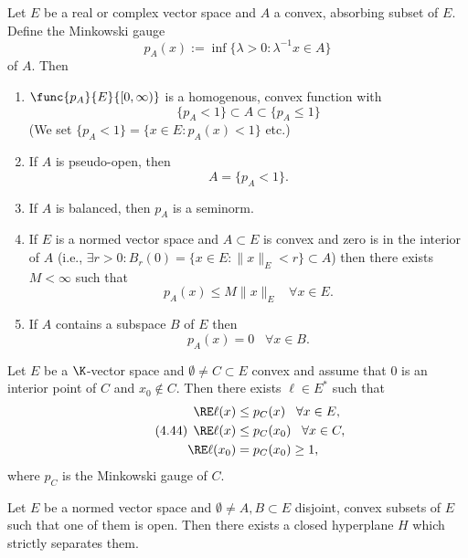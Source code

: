 \begin{prop}\label{iv.19}
    Let $E$ be a real or complex vector space and $A$ a convex, absorbing subset of $E$. Define the Minkowski gauge
    \[p_A(x):=\inf\{\lambda>0\colon\lambda^{-1}x\in A\}\]
    of $A$. Then
    \begin{enumerate}[label=\alph*)]
        \item $\func{p_A}{E}{[0,\infty)}$ is a homogenous, convex function with\label{iv.19.a}
        \[\{p_A<1\}\subset A\subset \{p_A\leq1\}\tag{4.40}\label{4.40}\]
        \big(We set $\{p_A<1\}=\{x\in E\colon p_A(x)<1\}$ etc.\big)
        \item If $A$ is pseudo-open, then\label{iv.19.b}
        \[A=\{p_A<1\}.\tag{4.41}\label{4.41}\]
        \item If $A$ is balanced, then $p_A$ is a seminorm.\label{iv.19.c}
        \item If $E$ is a normed vector space and $A\subset E$ is convex and zero is in the interior of $A$ \big(i.e., $\exists r>0\colon B_r(0)=\{x\in E\colon\|x\|_E<r\}\subset A$\big) then there exists $M<\infty$ such that\label{iv.19.d}
        \[p_A(x)\leq M\|x\|_E\;\;\;\forall x\in E.\tag{4.42}\label{4.42}\]
        \item If $A$ contains a subspace $B$ of $E$ then\label{iv.19.e}
        \[p_A(x)=0\;\;\;\forall x\in B.\tag{4.43}\label{4.43}\]
    \end{enumerate}
\end{prop}

\begin{lem}\label{iv.20}
    Let $E$ be a $\K$-vector space and $\emptyset\neq C\subset E$ convex and assume that $0$ is an interior point of $C$ and $x_0\notin C$. Then there exists $\ell\in E^*$ such that
    \begin{equation}
    \tag{4.44}\label{4.44}
        \begin{aligned}
        \RE\ell(x)&\leq p_C(x)\;\;\;\forall x\in E,\\
        \RE\ell(x)&\leq p_C(x_0)\;\;\;\forall x\in C,\\
        \RE\ell(x_0)&=p_C(x_0)\geq1,
        \end{aligned}
    \end{equation}
    where $p_C$ is the Minkowski gauge of $C$.
\end{lem}

\begin{thm}\label{iv.21}
    Let $E$ be a normed vector space and $\emptyset\neq A,B\subset E$ disjoint, convex subsets of $E$ such that one of them is open. Then there exists a closed hyperplane $H$ which strictly separates them.
\end{thm}

